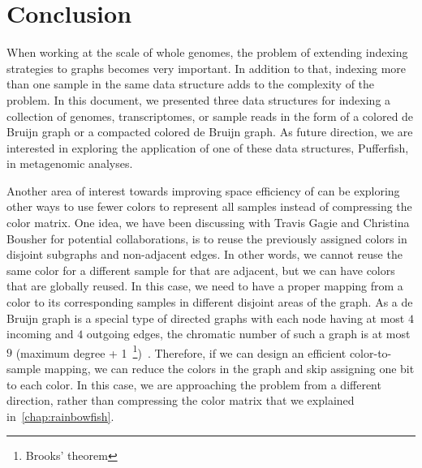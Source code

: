 \chapter{Conclusion}

When working at the scale of whole genomes,
the problem of extending indexing strategies to graphs becomes very important.
In addition to that, indexing more than one sample in the same data structure
adds to the complexity of the problem.
In this document, we presented three data structures
for indexing a collection of genomes, transcriptomes, or sample reads
in the form of a colored de Bruijn graph or a compacted colored de Bruijn graph.
As future direction, we are interested in exploring the application
of one of these data structures, Pufferfish, in metagenomic analyses.

Another area of interest towards improving space efficiency of \cdbgs
can be exploring other ways to use fewer colors to represent all samples instead of compressing the color matrix. One idea, we have been discussing with Travis Gagie and Christina Bousher for potential collaborations, is to reuse the previously assigned colors in disjoint subgraphs and non-adjacent edges. In other words, we cannot reuse the same color for a different sample for \kmers that are adjacent, but we can have colors that are globally reused. In this case, we need to have a proper mapping from a color to its corresponding samples in different disjoint areas of the graph. As a de Bruijn graph is a special type of directed graphs with each node having at most $4$ incoming and $4$ outgoing edges, the chromatic number of such a graph is at most $9$ (maximum degree + 1~\footnote{Brooks' theorem})~\cite{cranston2015brooks}. Therefore, if we can design an efficient color-to-sample mapping, we can reduce the colors in the graph and skip assigning one bit to each color. In this case, we are approaching the problem from a different direction, rather than compressing the color matrix that we explained in~\ref{chap:rainbowfish}.

